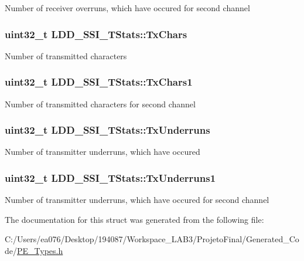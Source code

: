 Number of receiver overruns, which have occured for second channel \hypertarget{struct_l_d_d___s_s_i___t_stats_abaff1182d41c2c211ce8da947df77bbd}{
\subsubsection[{Tx\-Chars}]{\setlength{\rightskip}{0pt plus 5cm}uint32\-\_\-t L\-D\-D\-\_\-\-S\-S\-I\-\_\-\-T\-Stats\-::\-Tx\-Chars}}\label{struct_l_d_d___s_s_i___t_stats_abaff1182d41c2c211ce8da947df77bbd}
Number of transmitted characters \hypertarget{struct_l_d_d___s_s_i___t_stats_a0721d681a52cc566e4c89de10e962923}{
\subsubsection[{Tx\-Chars1}]{\setlength{\rightskip}{0pt plus 5cm}uint32\-\_\-t L\-D\-D\-\_\-\-S\-S\-I\-\_\-\-T\-Stats\-::\-Tx\-Chars1}}\label{struct_l_d_d___s_s_i___t_stats_a0721d681a52cc566e4c89de10e962923}
Number of transmitted characters for second channel \hypertarget{struct_l_d_d___s_s_i___t_stats_a5ac8911e76989013a9a4757a90aa5660}{
\subsubsection[{Tx\-Underruns}]{\setlength{\rightskip}{0pt plus 5cm}uint32\-\_\-t L\-D\-D\-\_\-\-S\-S\-I\-\_\-\-T\-Stats\-::\-Tx\-Underruns}}\label{struct_l_d_d___s_s_i___t_stats_a5ac8911e76989013a9a4757a90aa5660}
Number of transmitter underruns, which have occured \hypertarget{struct_l_d_d___s_s_i___t_stats_a14fb329147ead1d214cd25ffd3b39f6d}{
\subsubsection[{Tx\-Underruns1}]{\setlength{\rightskip}{0pt plus 5cm}uint32\-\_\-t L\-D\-D\-\_\-\-S\-S\-I\-\_\-\-T\-Stats\-::\-Tx\-Underruns1}}\label{struct_l_d_d___s_s_i___t_stats_a14fb329147ead1d214cd25ffd3b39f6d}
Number of transmitter underruns, which have occured for second channel 

The documentation for this struct was generated from the following file\-:\begin{DoxyCompactItemize}
\item 
C\-:/\-Users/ea076/\-Desktop/194087/\-Workspace\-\_\-\-L\-A\-B3/\-Projeto\-Final/\-Generated\-\_\-\-Code/\hyperlink{_p_e___types_8h}{P\-E\-\_\-\-Types.\-h}\end{DoxyCompactItemize}
